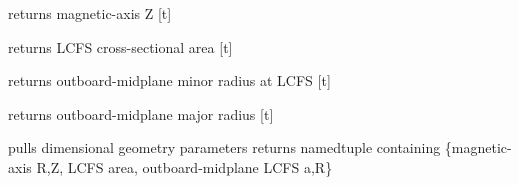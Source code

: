 \documentclass[letterpaper,10pt,english]{sphinxmanual}
\begin{document}
\begin{fulllineitems}
\begin{fulllineitems}
\end{fulllineitems}


\begin{fulllineitems}
\label{eqtools:eqtools.EFIT.EFITTree.getMagZ}
returns magnetic-axis Z {[}t{]}

\end{fulllineitems}


\begin{fulllineitems}
\label{eqtools:eqtools.EFIT.EFITTree.getAreaLCFS}
returns LCFS cross-sectional area {[}t{]}

\end{fulllineitems}


\begin{fulllineitems}
\label{eqtools:eqtools.EFIT.EFITTree.getAOut}
returns outboard-midplane minor radius at LCFS {[}t{]}

\end{fulllineitems}


\begin{fulllineitems}
\label{eqtools:eqtools.EFIT.EFITTree.getRmidOut}
returns outboard-midplane major radius {[}t{]}

\end{fulllineitems}


\begin{fulllineitems}
\label{eqtools:eqtools.EFIT.EFITTree.getGeometry}
pulls dimensional geometry parameters
returns namedtuple containing \{magnetic-axis R,Z, LCFS area, outboard-midplane LCFS a,R\}

\end{fulllineitems}



\end{fulllineitems}
\end{document}
